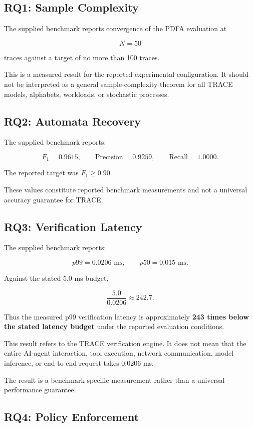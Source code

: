 \documentclass[11pt,a4paper]{article}
\begin{document}
\subsection{RQ1: Sample Complexity}

The supplied benchmark reports convergence of the PDFA evaluation at

\[
N=50
\]

traces against a target of no more than 100 traces.

This is a measured result for the reported experimental configuration. It should not be
interpreted as a general sample-complexity theorem for all TRACE models, alphabets,
workloads, or stochastic processes.

\subsection{RQ2: Automata Recovery}

The supplied benchmark reports:

\[
F_1=0.9615,
\qquad
\mathrm{Precision}=0.9259,
\qquad
\mathrm{Recall}=1.0000.
\]

The reported target was $F_1\geq0.90$.

These values constitute reported benchmark measurements and not a universal accuracy
guarantee for TRACE.

\subsection{RQ3: Verification Latency}

The supplied benchmark reports:

\[
p99=0.0206\text{ ms},
\qquad
p50=0.015\text{ ms}.
\]

Against the stated 5.0 ms budget,

\[
\frac{5.0}{0.0206}\approx242.7.
\]

Thus the measured p99 verification latency is approximately \textbf{243 times below
the stated latency budget} under the reported evaluation conditions.

This result refers to the TRACE verification engine. It does not mean that the entire
AI-agent interaction, tool execution, network communication, model inference, or
end-to-end request takes 0.0206 ms.

The result is a benchmark-specific measurement rather than a universal performance
guarantee.

\subsection{RQ4: Policy Enforcement}
\end{document}
